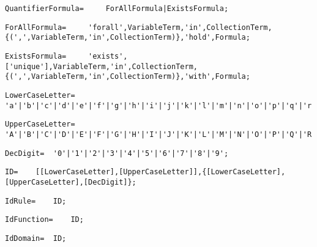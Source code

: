 \documentclass{article}
\begin{document}
    \begin{lstlisting}[mathescape=true]
     QuantifierFormula= 	ForAllFormula|ExistsFormula;
    \end{lstlisting}
    
    \begin{lstlisting}[mathescape=true]
     ForAllFormula= 	'forall',VariableTerm,'in',CollectionTerm,{(',',VariableTerm,'in',CollectionTerm)},'hold',Formula;
    \end{lstlisting}
    
    \begin{lstlisting}[mathescape=true]
     ExistsFormula= 	'exists',['unique'],VariableTerm,'in',CollectionTerm,{(',',VariableTerm,'in',CollectionTerm)},'with',Formula;
    \end{lstlisting}
    
    \begin{lstlisting}[mathescape=true]
     LowerCaseLetter= 	'a'|'b'|'c'|'d'|'e'|'f'|'g'|'h'|'i'|'j'|'k'|'l'|'m'|'n'|'o'|'p'|'q'|'r'|'s'|'t'|'u'|'v'|'w'|'x'|'y'|'z';
    \end{lstlisting}
    
    \begin{lstlisting}[mathescape=true]
     UpperCaseLetter= 	'A'|'B'|'C'|'D'|'E'|'F'|'G'|'H'|'I'|'J'|'K'|'L'|'M'|'N'|'O'|'P'|'Q'|'R'|'S'|'T'|'U'|'V'|'W'|'X'|'Y'|'Z';
    \end{lstlisting}
    
    \begin{lstlisting}[mathescape=true]
     DecDigit= 	'0'|'1'|'2'|'3'|'4'|'5'|'6'|'7'|'8'|'9';
    \end{lstlisting}
    
    \begin{lstlisting}[mathescape=true]
     ID= 	[[LowerCaseLetter],[UpperCaseLetter]],{[LowerCaseLetter],[UpperCaseLetter],[DecDigit]};
    \end{lstlisting}
    
    \begin{lstlisting}[mathescape=true]
     IdRule= 	ID;
    \end{lstlisting}
    
    \begin{lstlisting}[mathescape=true]
     IdFunction= 	ID;
    \end{lstlisting}
    
    \begin{lstlisting}[mathescape=true]
     IdDomain= 	ID;
    \end{lstlisting}
    
\end{document}
